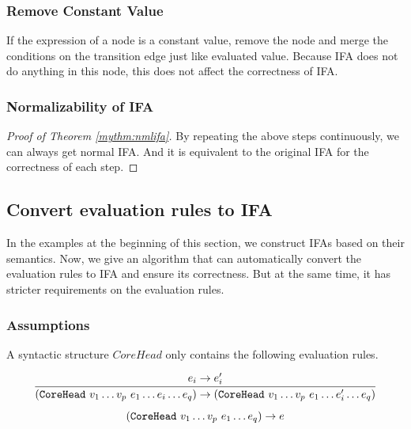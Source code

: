 \subsubsection{Remove Constant Value}

If the expression of a node is a constant value, remove the node and merge the conditions on the transition edge just like evaluated value. Because IFA does not do anything in this node, this does not affect the correctness of IFA.

\subsubsection{Normalizability of IFA}

\begin{proof}[Proof of Theorem \ref{mythm:nmlifa}]
By repeating the above steps continuously, we can always get normal IFA. And it is equivalent to the original IFA for the correctness of each step.
\end{proof}

\subsection{Convert evaluation rules to IFA}

In the examples at the beginning of this section, we construct IFAs based on their semantics. Now, we give an algorithm that can automatically convert the evaluation rules to IFA and ensure its correctness. But at the same time, it has stricter requirements on the evaluation rules.

\subsubsection{Assumptions}

\begin{Asm}
\label{Asm:rules}
A syntactic structure $CoreHead$ only contains the following evaluation rules.

\[
\infer
{(\m{CoreHead}~v_1\ldots v_p~e_1 \ldots e_i \ldots e_q) \to   (\m{CoreHead}~v_1\ldots v_p~e_1 \ldots e_i' \ldots e_q)}{e_i \to e_i'}
\]
\[
(\mbox{\tt CoreHead}~v_1 \ldots v_p~e_1 \ldots e_q) \to e
\]


\end{Asm}

